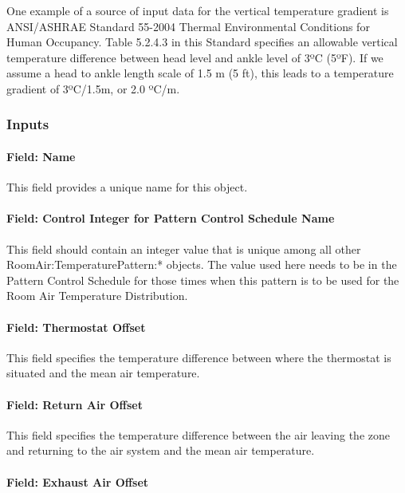 One example of a source of input data for the vertical temperature gradient is ANSI/ASHRAE Standard 55-2004 Thermal Environmental Conditions for Human Occupancy. Table 5.2.4.3 in this Standard specifies an allowable vertical temperature difference between head level and ankle level of 3ºC (5ºF). If we assume a head to ankle length scale of 1.5 m (5 ft), this leads to a temperature gradient of 3ºC/1.5m, or 2.0 ºC/m.

\subsubsection{Inputs}\label{inputs-2-035}

\paragraph{Field: Name}\label{field-name-2-033}

This field provides a unique name for this object.

\paragraph{Field: Control Integer for Pattern Control Schedule Name}\label{field-control-integer-for-pattern-control-schedule-name}

This field should contain an integer value that is unique among all other RoomAir:TemperaturePattern:* objects. The value used here needs to be in the Pattern Control Schedule for those times when this pattern is to be used for the Room Air Temperature Distribution.

\paragraph{Field: Thermostat Offset}\label{field-thermostat-offset}

This field specifies the temperature difference between where the thermostat is situated and the mean air temperature.

\paragraph{Field: Return Air Offset}\label{field-return-air-offset}

This field specifies the temperature difference between the air leaving the zone and returning to the air system and the mean air temperature.

\paragraph{Field: Exhaust Air Offset}\label{field-exhaust-air-offset}

